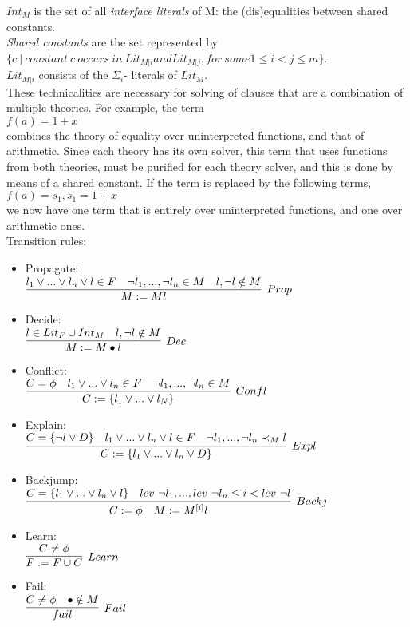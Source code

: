\documentclass{article}
\begin{document}
$Int_M$ is the set of all \textit{interface literals} of M:
the (dis)equalities between shared constants. \\
\textit{Shared constants} are the set represented by \\
$\{c\ |\ constant\ c\ occurs\ in\ Lit_{M|i} and Lit_{M|j}, 
for\ some 1 \leq i < j \leq m\}$. \\
$Lit_{M|i}$ consists of the $\Sigma_i$- literals of $Lit_M$. \\
These technicalities are necessary for solving of clauses 
that are a combination of multiple theories. 
For example, the term \\
$f(a) = 1 + x$ \\
combines the theory of equality over uninterpreted functions,
and that of arithmetic. Since each theory has its own solver,
this term that uses functions from both theories, must be 
purified for each theory solver, and this is done by means of
a shared constant. If the term is replaced by the following 
terms, \\
$f(a) = s_1, s_1 = 1 + x$ \\
we now have one term that is entirely over uninterpreted 
functions, and one over arithmetic ones. \\
Transition rules:
\begin{itemize}
	\item Propagate:\\ $\infer[Prop]{M := Ml}{l_1 \lor ... \lor l_n \lor l \in F 
		& \neg l_1,...,\neg l_n \in M & l, \neg l \notin M}$ 
	\item Decide:\\ $\infer[Dec]{M := M \bullet l}
	{l \in Lit_F \cup Int_M & l, \neg l \notin M}$ \\
	\item Conflict:\\ $\infer[Confl]{C:=\{l_1 \lor ... \lor l_N\}}
	{C = \phi & l_1 \lor ... \lor l_n \in F & \neg l_1,...,\neg l_n \in M}$ 
	\item Explain:\\ $\infer[Expl]{C := \{l_1 \lor ... \lor l_n \lor D\}}
	{C = \{\neg l \lor D\} & l_1 \lor ... \lor l_n \lor l \in F 
		& \neg l_1,...,\neg l_n \prec_M l}$
	\item Backjump:\\ $\infer[Backj]{C := \phi\ \ \ M := M^{[i]}l}
	{C = \{l_1 \lor ... \lor l_n \lor l\} & 
		lev\ \neg l_1, ... , lev\ \neg l_n \leq i < lev\ \neg l}$
	\item Learn: \\ $\infer[Learn]{F := F \cup C}{C \neq \phi}$
	\item Fail:\\ $\infer[Fail]{fail}{C \neq \phi & \bullet \notin M}$
\end{itemize}
\end{document}
